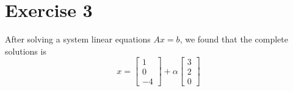 \section{Exercise 3}
After solving a system linear equations $Ax=b$, we found that the complete
solutions is
\begin{equation}
    x   =
        \begin{bmatrix}
            1       \\
            0       \\
            -4
        \end{bmatrix}
        +
        \alpha
        \begin{bmatrix}
            3       \\
            2       \\
            0
        \end{bmatrix}
\end{equation}
